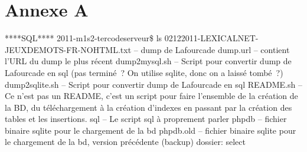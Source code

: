 \documentclass[a4paper,11pt,french]{article}
\begin{document}
{%








\section{Annexe A}


****SQL****
2011-m1s2-ter\/code\/serveur\$ ls
02122011-LEXICALNET-JEUXDEMOTS-FR-NOHTML.txt  -- dump de Lafourcade
dump.url -- contient l'URL du dump le plus récent
dump2mysql.sh -- Script pour convertir dump de Lafourcade en sql (pas terminé~? On utilise sqlite, donc on a laissé tombé~?)
dump2sqlite.sh  -- Script pour convertir dump de Lafourcade en sql
README.sh -- Ce n'est pas un README, c'est un script pour faire l'ensemble de la création de la BD, du téléchargement à la création d'indexes en passant par la création des tables et les insertions.
sql -- Le script sql à proprement parler
php\/db -- fichier binaire sqlite pour le chargement de la bd
php\/db.old -- fichier binaire sqlite pour le chargement de la bd, version précédente (backup)
dossier: select

}
\end{document}
